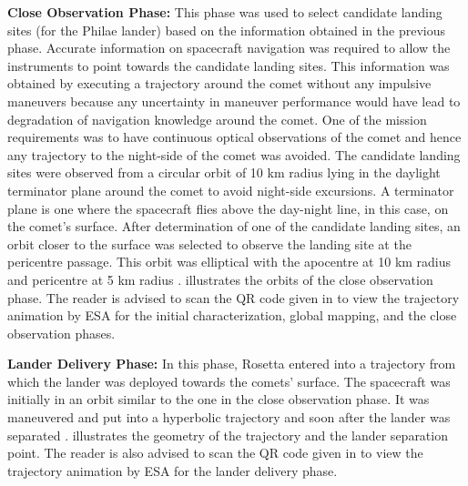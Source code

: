 \textbf{Close Observation Phase:} This phase was used to select candidate landing sites (for the Philae lander) based on the information obtained in the previous phase. Accurate information on spacecraft navigation was required to allow the instruments to point towards the candidate landing sites. This information was obtained by executing a trajectory around the comet without any impulsive maneuvers because any uncertainty in maneuver performance would have lead to degradation of navigation knowledge around the comet. One of the mission requirements was to have continuous optical observations of the comet and hence any trajectory to the night-side of the comet was avoided. The candidate landing sites were observed from a circular orbit of 10 km radius lying in the daylight terminator plane around the comet to avoid night-side excursions. A terminator plane is one where the spacecraft flies above the day-night line, in this case, on the comet's surface. After determination of one of the candidate landing sites, an orbit closer to the surface was selected to observe the landing site at the pericentre passage. This orbit was elliptical with the apocentre at 10 km radius and pericentre at 5 km radius \cite{rosettanew2012}.  illustrates the orbits of the close observation phase. The reader is advised to scan the QR code given in  to view the trajectory animation by \gls{ESA} for the initial characterization, global mapping, and the close observation phases.

\textbf{Lander Delivery Phase:} In this phase, Rosetta entered into a trajectory from which the lander was deployed towards the comets' surface. The spacecraft was initially in an orbit similar to the one in the close observation phase. It was maneuvered and put into a hyperbolic trajectory and soon after the lander was separated \cite{rosettanew2012}.  illustrates the geometry of the trajectory and the lander separation point. The reader is also advised to scan the QR code given in  to view the trajectory animation by \gls{ESA} for the lander delivery phase.

